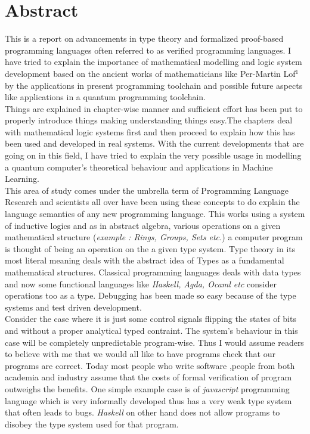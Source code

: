 \chapter*{Abstract}

This is a report on advancements in type theory and formalized proof-based programming languages often referred to as verified programming languages. I have tried to explain the importance of mathematical modelling and logic system development based on the ancient works of mathematicians like Per-Martin Lof$^{1}$  by the applications in present programming toolchain and possible future aspects like applications in a quantum  programming toolchain.\\

Things are explained in chapter-wise manner and sufficient effort has been put to properly introduce things making understanding things easy.The chapters deal with mathematical logic systems first and then proceed to explain how this has been used and developed in real systems. With the current developments that are going on in this field, I have tried to explain the very possible usage in modelling a quantum computer's theoretical behaviour and applications in Machine Learning.\\

This area of study comes under the umbrella term of Programming Language Research and scientists all over have been  using these concepts to do explain the language semantics of any new programming language. This works using a system of inductive logics and as in abstract algebra, various operations on a given mathematical structure (\textit{example : Rings, Groups, Sets etc.}) a computer program is thought of being an operation on the a given type system. Type theory in its most literal meaning deals with the abstract idea of Types as a fundamental mathematical structures. Classical programming languages deals with data types and now some functional languages like \textit{Haskell, Agda, Ocaml etc} consider operations too as a type. Debugging has been made so easy because of the type systems and test driven development.\\

Consider the case where it is just some control signals flipping the states of bits and without a proper analytical typed contraint. The system's behaviour in this case will be completely unpredictable program-wise. Thus I would assume readers to believe with me that we would all like to have programs check that our programs are correct. Today most people who write software ,people from both academia and industry assume that the costs of formal verification of program outweighs the benefits. One simple example case is of \textit{javascript} programming language which is very informally developed thus has a very weak type system that often leads to bugs.  \textit{Haskell} on other hand does not allow programs to disobey the type system used for that program.\\ 
